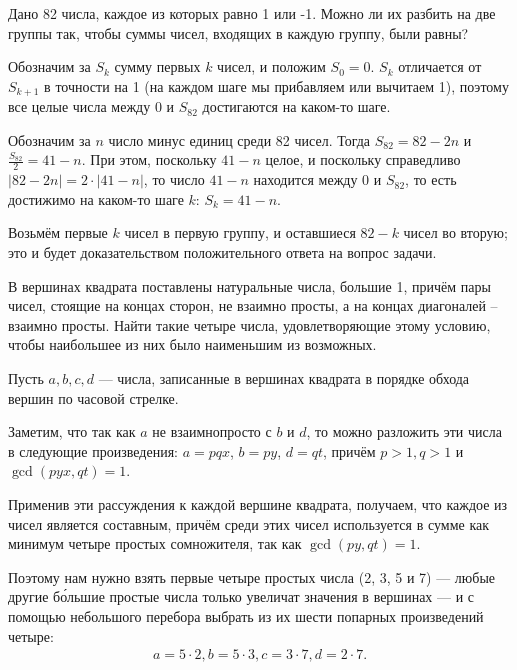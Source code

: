

\begin{itemize}
\itA Дано 82 числа, каждое из которых равно 1 или -1. Можно ли их разбить на две группы так, 
чтобы суммы чисел, входящих в каждую группу, были равны?

\itr Обозначим за $S_k$ сумму первых $k$ чисел, и положим $S_0 = 0$. 
$S_k$ отличается от $S_{k+1}$ в точности на 1 (на каждом шаге мы прибавляем или 
вычитаем 1), поэтому все целые числа между $0$ и $S_{82}$ достигаются на каком-то шаге.

Обозначим за $n$ число минус единиц среди 82 чисел. Тогда $S_{82} = 82-2n$
и $\frac{S_{82}}{2} = 41-n$. При этом, поскольку $41-n$ целое, и поскольку справедливо 
$|82-2n|=2\cdot|41-n|$, то число $41-n$ находится между 0 и $S_{82}$, то есть 
достижимо на каком-то шаге $k$: $S_k = 41-n$.

Возьмём первые $k$ чисел в первую группу, и оставшиеся $82-k$ чисел во вторую; это и будет
доказательством положительного ответа на вопрос задачи.
\end{itemize}


\begin{itemize}
\itC В вершинах квадрата поставлены натуральные числа, большие 1, причём пары чисел, стоящие на концах сторон, не взаимно просты, а на концах диагоналей – взаимно просты. Найти такие четыре числа, удовлетворяющие этому условию,
чтобы наибольшее из них было наименьшим из возможных.

\itr 
Пусть $a,b,c,d$ --- числа, записанные в вершинах квадрата в порядке обхода вершин по часовой стрелке. 

Заметим, что так как $a$ не взаимнопросто с $b$ и $d$, то можно разложить эти числа в следующие произведения:
$a = pqx$, $b = py$, $d = qt$, причём $p>1, q>1$ и $\gcd(pyx,qt)=1$. 

Применив эти рассуждения к каждой вершине квадрата, получаем, что каждое из чисел является
составным, причём среди этих чисел используется в сумме как минимум четыре простых сомножителя, 
так как $\gcd(py,qt)=1$. 

Поэтому нам нужно взять первые четыре простых числа (2, 3, 5 и 7) --- любые другие б\'ольшие простые числа
только увеличат значения в вершинах --- и с помощью небольшого перебора
выбрать из их шести попарных произведений четыре:
$$
\begin{array}{l}
a=5 \cdot 2,
b=5 \cdot 3,
c=3 \cdot 7,
d=2 \cdot 7.
\end{array}
$$
\end{itemize}

